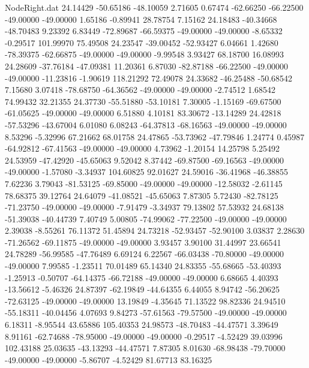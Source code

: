\begin{filecontents}{NodeRight.dat}
  24.14429  -50.65186  -48.10059     2.71605    0.67474  -62.66250  -66.22500  -49.00000  -49.00000    1.65186   -0.89941   28.78754    7.15162
  24.18483  -40.34668  -48.70483     9.23392    6.83449  -72.89687  -66.59375  -49.00000  -49.00000   -8.65332   -0.29517  101.99970   75.49508
  24.23547  -39.00452  -52.93427     6.04661    1.42680  -78.39375  -62.66875  -49.00000  -49.00000   -9.99548    3.93427   68.18700   16.08993
  24.28609  -37.76184  -47.09381    11.20361    6.87030  -82.87188  -66.22500  -49.00000  -49.00000  -11.23816   -1.90619  118.21292   72.49078
  24.33682  -46.25488  -50.68542     7.15680    3.07418  -78.68750  -64.36562  -49.00000  -49.00000   -2.74512    1.68542   74.99432   32.21355
  24.37730  -55.51880  -53.10181     7.30005   -1.15169  -69.67500  -61.05625  -49.00000  -49.00000    6.51880    4.10181   83.30672  -13.14289
  24.42818  -57.53296  -43.67004     6.01080    6.08243  -64.37813  -68.16563  -49.00000  -49.00000    8.53296   -5.32996   67.21662   68.01758
  24.47865  -53.73962  -47.79846     1.24774    0.45987  -64.92812  -67.41563  -49.00000  -49.00000    4.73962   -1.20154   14.25798    5.25492
  24.53959  -47.42920  -45.65063     9.52042    8.37442  -69.87500  -69.16563  -49.00000  -49.00000   -1.57080   -3.34937  104.60825   92.01627
  24.59016  -36.41968  -46.38855     7.62236    3.79043  -81.53125  -69.85000  -49.00000  -49.00000  -12.58032   -2.61145   78.68375   39.12764
  24.64079  -41.08521  -45.65063     7.87305    5.72430  -82.78125  -71.23750  -49.00000  -49.00000   -7.91479   -3.34937   79.13802   57.53932
  24.68138  -51.39038  -40.44739     7.40749    5.00805  -74.99062  -77.22500  -49.00000  -49.00000    2.39038   -8.55261   76.11372   51.45894
  24.73218  -52.93457  -52.90100     3.03837    2.28630  -71.26562  -69.11875  -49.00000  -49.00000    3.93457    3.90100   31.44997   23.66541
  24.78289  -56.99585  -47.76489     6.69124    6.22567  -66.03438  -70.80000  -49.00000  -49.00000    7.99585   -1.23511   70.01489   65.14340
  24.83355  -55.68665  -53.40393    -1.25913   -0.50707  -64.14375  -66.72188  -49.00000  -49.00000    6.68665    4.40393  -13.56612   -5.46326
  24.87397  -62.19849  -44.64355     6.44055    8.94742  -56.20625  -72.63125  -49.00000  -49.00000   13.19849   -4.35645   71.13522   98.82336
  24.94510  -55.18311  -40.04456     4.07693    9.84273  -57.61563  -79.57500  -49.00000  -49.00000    6.18311   -8.95544   43.65886  105.40353
  24.98573  -48.70483  -44.47571     3.39649    8.91161  -62.74688  -78.95000  -49.00000  -49.00000   -0.29517   -4.52429   39.03996  102.43188
  25.03635  -43.13293  -44.47571     7.87305    8.01630  -68.98438  -79.70000  -49.00000  -49.00000   -5.86707   -4.52429   81.67713   83.16325

\end{filecontents}
